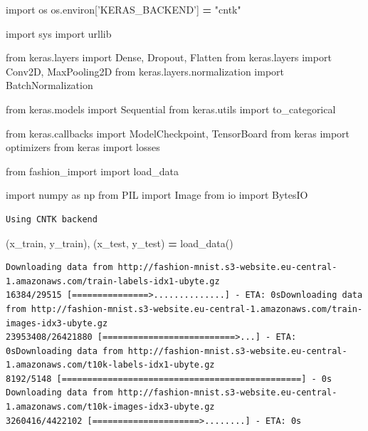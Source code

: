 \documentclass[]{book}
\newenvironment{Shaded}{\begin{snugshade}}{\end{snugshade}}
\newcommand{\StringTok}[1]{\textcolor[rgb]{0.31,0.60,0.02}{#1}}
\newcommand{\ImportTok}[1]{#1}
\newcommand{\OperatorTok}[1]{\textcolor[rgb]{0.81,0.36,0.00}{\textbf{#1}}}
\newcommand{\NormalTok}[1]{#1}
\theoremstyle{definition}
\theoremstyle{definition}
\theoremstyle{definition}
\theoremstyle{remark}
\begin{document}
\begin{Shaded}
\begin{Highlighting}[]
\ImportTok{import}\NormalTok{ os}
\NormalTok{os.environ[}\StringTok{'KERAS_BACKEND'}\NormalTok{] }\OperatorTok{=} \StringTok{"cntk"}

\ImportTok{import}\NormalTok{ sys}
\ImportTok{import}\NormalTok{ urllib}

\ImportTok{from}\NormalTok{ keras.layers }\ImportTok{import}\NormalTok{ Dense, Dropout, Flatten}
\ImportTok{from}\NormalTok{ keras.layers }\ImportTok{import}\NormalTok{ Conv2D, MaxPooling2D}
\ImportTok{from}\NormalTok{ keras.layers.normalization }\ImportTok{import}\NormalTok{ BatchNormalization}

\ImportTok{from}\NormalTok{ keras.models }\ImportTok{import}\NormalTok{ Sequential}
\ImportTok{from}\NormalTok{ keras.utils }\ImportTok{import}\NormalTok{ to_categorical}

\ImportTok{from}\NormalTok{ keras.callbacks }\ImportTok{import}\NormalTok{ ModelCheckpoint, TensorBoard}
\ImportTok{from}\NormalTok{ keras }\ImportTok{import}\NormalTok{ optimizers}
\ImportTok{from}\NormalTok{ keras }\ImportTok{import}\NormalTok{ losses}

\ImportTok{from}\NormalTok{ fashion_import }\ImportTok{import}\NormalTok{ load_data}

\ImportTok{import}\NormalTok{ numpy }\ImportTok{as}\NormalTok{ np}
\ImportTok{from}\NormalTok{ PIL }\ImportTok{import}\NormalTok{ Image}
\ImportTok{from}\NormalTok{ io }\ImportTok{import}\NormalTok{ BytesIO}
\end{Highlighting}
\end{Shaded}

\begin{verbatim}
Using CNTK backend
\end{verbatim}

\begin{Shaded}
\begin{Highlighting}[]
\NormalTok{(x_train, y_train), (x_test, y_test) }\OperatorTok{=}\NormalTok{ load_data()}
\end{Highlighting}
\end{Shaded}

\begin{verbatim}
Downloading data from http://fashion-mnist.s3-website.eu-central-1.amazonaws.com/train-labels-idx1-ubyte.gz
16384/29515 [===============>..............] - ETA: 0sDownloading data from http://fashion-mnist.s3-website.eu-central-1.amazonaws.com/train-images-idx3-ubyte.gz
23953408/26421880 [==========================>...] - ETA: 0sDownloading data from http://fashion-mnist.s3-website.eu-central-1.amazonaws.com/t10k-labels-idx1-ubyte.gz
8192/5148 [===============================================] - 0s
Downloading data from http://fashion-mnist.s3-website.eu-central-1.amazonaws.com/t10k-images-idx3-ubyte.gz
3260416/4422102 [=====================>........] - ETA: 0s
\end{verbatim}
\end{document}
